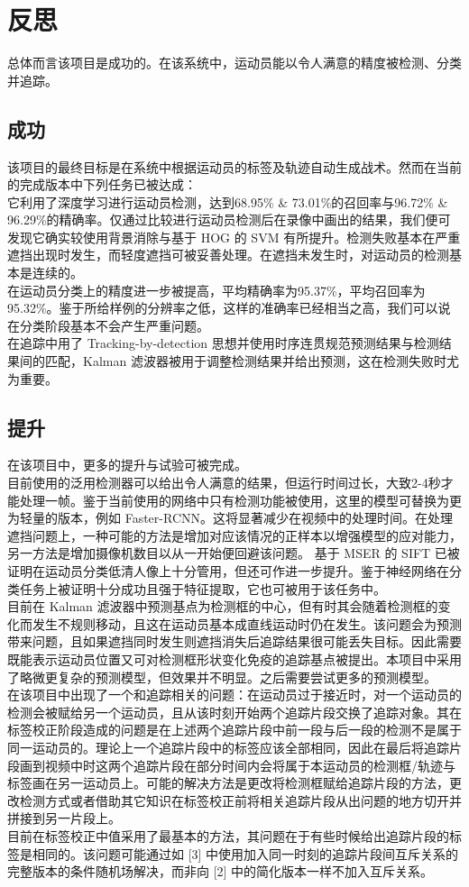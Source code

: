 \documentclass{article}
\begin{document}
\section{反思}
总体而言该项目是成功的。在该系统中，运动员能以令人满意的精度被检测、分类并追踪。
\subsection{成功}
该项目的最终目标是在系统中根据运动员的标签及轨迹自动生成战术。然而在当前的完成版本中下列任务已被达成：\\
它利用了深度学习进行运动员检测，达到68.95\% \& 73.01\%的召回率与96.72\% \& 96.29\%的精确率。仅通过比较进行运动员检测后在录像中画出的结果，我们便可发现它确实较使用背景消除与基于 HOG 的 SVM 有所提升。检测失败基本在严重遮挡出现时发生，而轻度遮挡可被妥善处理。在遮挡未发生时，对运动员的检测基本是连续的。\\
在运动员分类上的精度进一步被提高，平均精确率为95.37\%，平均召回率为95.32\%。鉴于所给样例的分辨率之低，这样的准确率已经相当之高，我们可以说在分类阶段基本不会产生严重问题。\\
在追踪中用了 Tracking-by-detection 思想并使用时序连贯规范预测结果与检测结果间的匹配，Kalman 滤波器被用于调整检测结果并给出预测，这在检测失败时尤为重要。
\subsection{提升}
在该项目中，更多的提升与试验可被完成。\\
目前使用的泛用检测器可以给出令人满意的结果，但运行时间过长，大致2-4秒才能处理一帧。鉴于当前使用的网络中只有检测功能被使用，这里的模型可替换为更为轻量的版本，例如 Faster-RCNN。这将显著减少在视频中的处理时间。在处理遮挡问题上，一种可能的方法是增加对应该情况的正样本以增强模型的应对能力，另一方法是增加摄像机数目以从一开始便回避该问题。
基于 MSER 的 SIFT 已被证明在运动员分类低清人像上十分管用，但还可作进一步提升。鉴于神经网络在分类任务上被证明十分成功且强于特征提取，它也可被用于该任务中。\\
目前在 Kalman 滤波器中预测基点为检测框的中心，但有时其会随着检测框的变化而发生不规则移动，且这在运动员基本成直线运动时仍在发生。该问题会为预测带来问题，且如果遮挡同时发生则遮挡消失后追踪结果很可能丢失目标。因此需要既能表示运动员位置又可对检测框形状变化免疫的追踪基点被提出。本项目中采用了略微更复杂的预测模型，但效果并不明显。之后需要尝试更多的预测模型。\\
在该项目中出现了一个和追踪相关的问题：在运动员过于接近时，对一个运动员的检测会被赋给另一个运动员，且从该时刻开始两个追踪片段交换了追踪对象。其在标签校正阶段造成的问题是在上述两个追踪片段中前一段与后一段的检测不是属于同一运动员的。理论上一个追踪片段中的标签应该全部相同，因此在最后将追踪片段画到视频中时这两个追踪片段在部分时间内会将属于本运动员的检测框/轨迹与标签画在另一运动员上。可能的解决方法是更改将检测框赋给追踪片段的方法，更改检测方式或者借助其它知识在标签校正前将相关追踪片段从出问题的地方切开并拼接到另一片段上。\\
目前在标签校正中值采用了最基本的方法，其问题在于有些时候给出追踪片段的标签是相同的。该问题可能通过如 [3] 中使用加入同一时刻的追踪片段间互斥关系的完整版本的条件随机场解决，而非向 [2] 中的简化版本一样不加入互斥关系。
\end{document}
